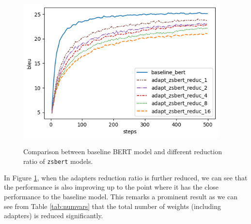 \begin{figure}[]
    {\includegraphics[width=0.95\textwidth]{img/adapter_zsbert_ratio.png}}
    \centering
    \caption{Comparison between baseline BERT model and different reduction ratio of \texttt{zsbert} models.}
    \label{img:adapter_zsbert_ratio}
\end{figure}

In Figure \ref{img:adapter_zsbert_ratio}, when the adapters reduction ratio is further reduced, we can see that the performance is also improving up to the point where it has the close performance to the baseline model. This remarks a prominent result as we can see from Table \ref{tab:numvars} that the total number of weights (including adapters) is reduced significantly.

